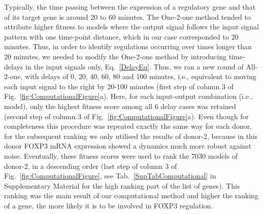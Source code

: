 \documentclass[oneside, 10pt, a4paper, twocolumn]{article}
\begin{document}
{Typically, the time passing between the expression of a regulatory gene and that of its target gene is around 20 to 60 minutes. The One-2-one method tended to attribute higher fitness to models where the output signal follows the input signal pattern with one time-point distance, which in our case corresponded to 20 minutes. Thus, in order to identify regulations occurring over times longer than 20 minutes, we needed to modify the One-2-one method by introducing time-delays in the input signals only, Eq.~\eqref{DelayEq}. Thus, we ran a new round of All-2-one, with delays of 0, 20, 40, 60, 80 and 100 minutes, i.e., equivalent to moving each input signal to the right by 20-100 minutes (first step of column 3 of Fig.~\ref{fig:ComputationalFigure}a).
Here, for each input-output combination (i.e., model), only the highest fitness score among all 6 delay cases was retained (second step of column 3 of Fig.~\ref{fig:ComputationalFigure}a).
Even though for completeness this procedure was repeated exactly the same way for each donor, for the subsequent ranking we only utilised the results of donor-2, because in this donor FOXP3 mRNA expression showed a dynamics much more robust against noise. Eventually, these fitness scores were used to rank the 7030 models of donor-2, in a descending order (last step of column 3 of Fig.~\ref{fig:ComputationalFigure}, see Tab.~\ref{SupTabComputational} in Supplementary Material for the high ranking part of the list of genes). This ranking was the main result of our computational method and higher the ranking of a gene, the more likely it is to be involved in FOXP3 regulation.


}
\end{document}
